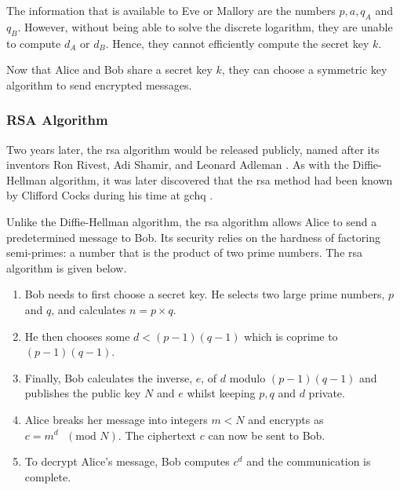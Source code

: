 The information that is available to Eve or Mallory are the numbers $p, a, q_{A}$ and $q_{B}$. However, without being able to solve the discrete logarithm, they are unable to compute $d_A$ or $d_B$. Hence, they cannot efficiently compute the secret key $k$.  

Now that Alice and Bob share a secret key $k$, they can choose a symmetric key algorithm to send encrypted messages.



\subsubsection*{RSA Algorithm}

Two years later, the \ac{rsa} algorithm would be released publicly, named after its inventors Ron Rivest, Adi Shamir, and Leonard Adleman \cite{rivest1978method}. As with the Diffie-Hellman algorithm, it was later discovered that the \ac{rsa} method had been known by Clifford Cocks during his time at \ac{gchq} \cite{Cocks1973}. 

Unlike the Diffie-Hellman algorithm, the \ac{rsa} algorithm allows Alice to send a predetermined message to Bob. Its security relies on the hardness of factoring semi-primes: a number that is the product of two prime numbers. The \ac{rsa} algorithm is given below.


\begin{algorithm}
\begin{enumerate}
	\item Bob needs to first choose a secret key. He selects two large prime numbers, $p$ and $q$, and calculates $n = p \times q$.
	\item He then chooses some $d < (p-1)(q-1)$ which is coprime to $(p-1)(q-1)$.
	\item Finally, Bob calculates the inverse, $e$, of $d$ modulo $(p-1)(q-1)$ and publishes the public key $N$ and $e$ whilst keeping $p,q$ and $d$ private.
	\item Alice breaks her message into integers $m < N$ and encrypts as $c = m^d\text{ }(\text{mod }N)$. The ciphertext $c$ can now be sent to Bob.
	\item To decrypt Alice's message, Bob computes $c^d$ and the communication is complete. 
\end{enumerate}   
\end{algorithm}

